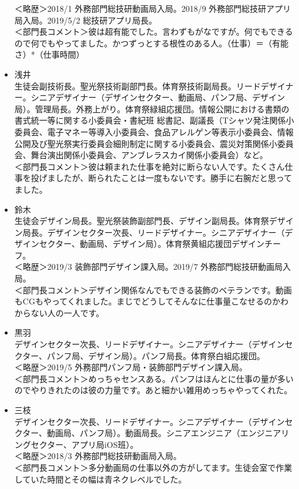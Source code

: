 \documentclass[dvipdfmx,jb5]{jarticle}
\begin{document}
\begin{itemize}
  ＜略歴＞2018/1 外務部門総技研動画局入局。2018/9 外務部門総技研アプリ局入局。2019/5/2 総技研アプリ局長。\\
  ＜部門長コメント＞彼は超有能でした。言わずもがなですが。何でもできるので何でもやってました。かつずっとする根性のある人。（仕事）＝（有能さ）*（仕事時間）
  \item 浅井\\
  生徒会副技術長。聖光祭技術副部門長。体育祭技術副局長。リードデザイナー。シニアデザイナー（デザインセクター、動画局、パンフ局、デザイン局）。管理局長。外務上がり。体育祭緑組応援団。情報公開における書類の書式統一等に関する小委員会・書紀班 総書記、副議長（Tシャツ発注関係小委員会、電子マネー等導入小委員会、食品アレルゲン等表示小委員会、情報公開及び聖光祭実行委員会細則制定に関する小委員会、震災対策関係小委員会、舞台演出関係小委員会、アンブレラスカイ関係小委員会）など。\\
  ＜部門長コメント＞彼は頼まれた仕事を絶対に断らない人です。たくさん仕事を投げましたが、断られたことは一度もないです。勝手に右腕だと思ってました。
  \item 鈴木\\
  生徒会デザイン局長。聖光祭装飾副部門長、デザイン副局長。体育祭デザイン局長。デザインセクター次長、リードデザイナー。シニアデザイナー（デザインセクター、動画局、デザイン局）。体育祭黄組応援団デザインチーフ。\\
  ＜略歴＞2019/3 装飾部門デザイン課入局。2019/7 外務部門総技研動画局入局。\\
  ＜部門長コメント＞デザイン関係なんでもできる装飾のベテランです。動画もCGもやってくれました。まじでどうしてそんなに仕事量こなせるのかわからない人の一人です。
  \item 黒羽\\
  デザインセクター次長、リードデザイナー。シニアデザイナー（デザインセクター、パンフ局、デザイン局）。パンフ局長。体育祭白組応援団。\\
  ＜略歴＞2019/5 外務部門パンフ局・装飾部門デザイン課入局。\\
  ＜部門長コメント＞めっちゃセンスある。パンフはほんとに仕事の量が多いのでやりきれたのは彼の力量です。あと細かい雑用めっちゃやってくれた。
  \item 三枝\\
  デザインセクター次長、リードデザイナー。シニアデザイナー（デザインセクター、動画局、パンフ局）。動画局長。シニアエンジニア（エンジニアリングセクター、アプリ局iOS班）。\\
  ＜略歴＞2018/3 外務部門総技研動画局入局。\\
  ＜部門長コメント＞多分動画局の仕事以外の方がしてます。生徒会室で作業していた時間とその幅は青ネクレベルでした。

\end{itemize}
\end{document}
